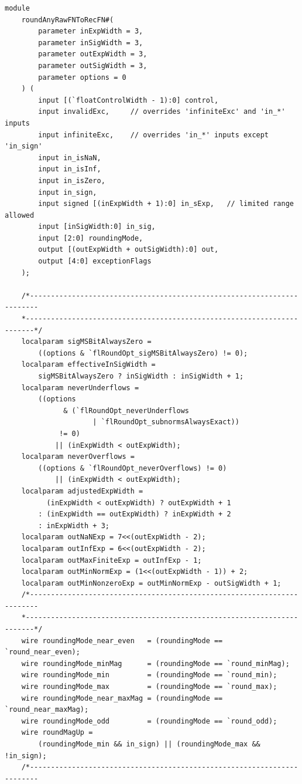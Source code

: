 \documentclass[12pt,letter]{article}
\begin{document}
\begin{lstlisting}
module
    roundAnyRawFNToRecFN#(
        parameter inExpWidth = 3,
        parameter inSigWidth = 3,
        parameter outExpWidth = 3,
        parameter outSigWidth = 3,
        parameter options = 0
    ) (
        input [(`floatControlWidth - 1):0] control,
        input invalidExc,     // overrides 'infiniteExc' and 'in_*' inputs
        input infiniteExc,    // overrides 'in_*' inputs except 'in_sign'
        input in_isNaN,
        input in_isInf,
        input in_isZero,
        input in_sign,
        input signed [(inExpWidth + 1):0] in_sExp,   // limited range allowed
        input [inSigWidth:0] in_sig,
        input [2:0] roundingMode,
        output [(outExpWidth + outSigWidth):0] out,
        output [4:0] exceptionFlags
    );

    /*------------------------------------------------------------------------
    *------------------------------------------------------------------------*/
    localparam sigMSBitAlwaysZero =
        ((options & `flRoundOpt_sigMSBitAlwaysZero) != 0);
    localparam effectiveInSigWidth =
        sigMSBitAlwaysZero ? inSigWidth : inSigWidth + 1;
    localparam neverUnderflows =
        ((options
              & (`flRoundOpt_neverUnderflows
                     | `flRoundOpt_subnormsAlwaysExact))
             != 0)
            || (inExpWidth < outExpWidth);
    localparam neverOverflows =
        ((options & `flRoundOpt_neverOverflows) != 0)
            || (inExpWidth < outExpWidth);
    localparam adjustedExpWidth =
          (inExpWidth < outExpWidth) ? outExpWidth + 1
        : (inExpWidth == outExpWidth) ? inExpWidth + 2
        : inExpWidth + 3;
    localparam outNaNExp = 7<<(outExpWidth - 2);
    localparam outInfExp = 6<<(outExpWidth - 2);
    localparam outMaxFiniteExp = outInfExp - 1;
    localparam outMinNormExp = (1<<(outExpWidth - 1)) + 2;
    localparam outMinNonzeroExp = outMinNormExp - outSigWidth + 1;
    /*------------------------------------------------------------------------
    *------------------------------------------------------------------------*/
    wire roundingMode_near_even   = (roundingMode == `round_near_even);
    wire roundingMode_minMag      = (roundingMode == `round_minMag);
    wire roundingMode_min         = (roundingMode == `round_min);
    wire roundingMode_max         = (roundingMode == `round_max);
    wire roundingMode_near_maxMag = (roundingMode == `round_near_maxMag);
    wire roundingMode_odd         = (roundingMode == `round_odd);
    wire roundMagUp =
        (roundingMode_min && in_sign) || (roundingMode_max && !in_sign);
    /*------------------------------------------------------------------------

\end{lstlisting}
\end{document}

